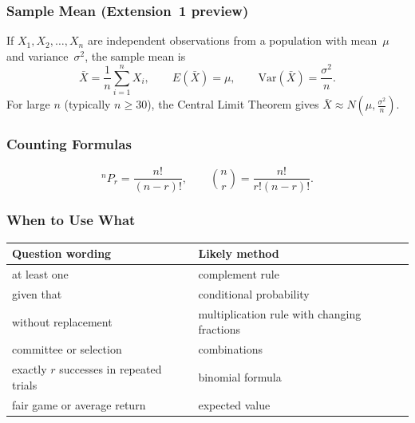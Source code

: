 \subsubsection*{Sample Mean (Extension~1 preview)}
If $X_1, X_2, \ldots, X_n$ are independent observations from a population with mean~$\mu$ and variance~$\sigma^2$, the sample mean is
\[
\bar{X} = \frac{1}{n}\sum_{i=1}^{n} X_i,
\qquad
E(\bar{X}) = \mu,
\qquad
\mathrm{Var}(\bar{X}) = \frac{\sigma^2}{n}.
\]
For large $n$ (typically $n \geq 30$), the Central Limit Theorem gives
$\bar{X} \approx N\!\left(\mu, \frac{\sigma^2}{n}\right)$.

\subsubsection*{Counting Formulas}
\[
{}^nP_r=\frac{n!}{(n-r)!},
\qquad
\binom{n}{r}=\frac{n!}{r!(n-r)!}.
\]

\subsubsection*{When to Use What}
\begin{center}
\begin{tabular}{p{5cm} p{9cm}}
\toprule
\textbf{Question wording} & \textbf{Likely method} \\
\midrule
at least one & complement rule \\
given that & conditional probability \\
without replacement & multiplication rule with changing fractions \\
committee or selection & combinations \\
exactly $r$ successes in repeated trials & binomial formula \\
fair game or average return & expected value \\
\bottomrule
\end{tabular}
\end{center}
